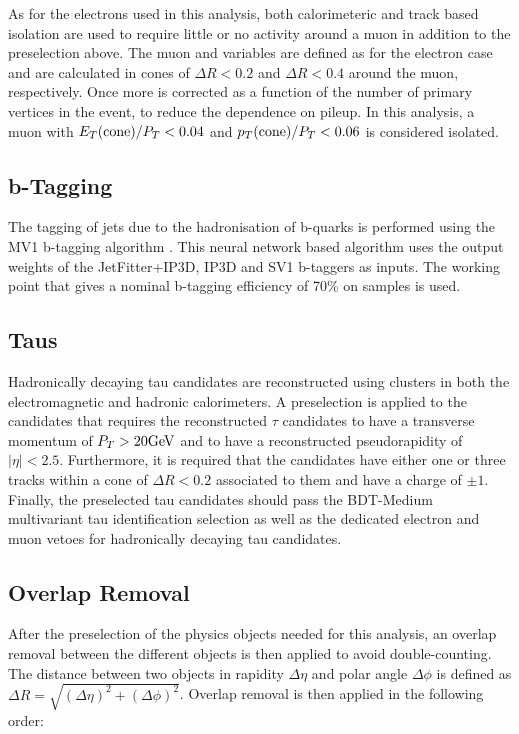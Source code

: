 As for the electrons used in this analysis, both calorimeteric and
track based isolation are used to require little or no activity around a muon
in addition to the preselection above. The muon \etcone and \ptcone
variables are defined as for the electron case and are calculated
in cones of $\Delta R<0.2$ and $\Delta R<0.4$ around the muon, respectively. 
Once more \etcone is corrected as a function of the number of primary vertices in the
event, to reduce the dependence on pileup. In this analysis, a muon with
$E_{T}(\mathrm{cone})/P_{T}<0.04$ and $p_{T}(\mathrm{cone})/P_{T}<0.06$ is considered isolated.



\subsection{b-Tagging}
\label{sec:presel:btag}

The tagging of jets due to the hadronisation of b-quarks is performed
using the MV1 b-tagging algorithm \cite{mv1}. This neural network based
algorithm uses the output weights of the JetFitter+IP3D, IP3D and
SV1 b-taggers as inputs. The working point that gives a nominal
b-tagging efficiency of 70\% on \ttbar samples is used.

\subsection{Taus}
\label{sec:presel:tau}

Hadronically decaying tau candidates are reconstructed using clusters
in both the electromagnetic and hadronic calorimeters. A preselection
is applied to the candidates that requires the reconstructed $\tau$
candidates to have a transverse momentum of $P_{T}>20 \text{GeV}$ and to have
a reconstructed pseudorapidity of $|\eta| < 2.5$. Furthermore, it is
required that the candidates have either one or three tracks within a
cone of $\Delta R < 0.2$ associated to them and have a charge of $\pm
1$. Finally, the preselected tau candidates should pass the BDT-Medium
multivariant tau identification selection as well as the dedicated
electron and muon vetoes for hadronically decaying tau candidates.


\subsection{Overlap Removal}
\label{sec:presel:olr}

After the preselection of the physics objects needed for this
analysis, an overlap removal between the different objects is then
applied to avoid double-counting.  The distance between two objects in
rapidity $\Delta\eta$ and polar angle $\Delta\phi$ is defined as
$\Delta R=\sqrt{(\Delta\eta)^2+(\Delta\phi)^2}$. Overlap removal is
then applied in the following order:

